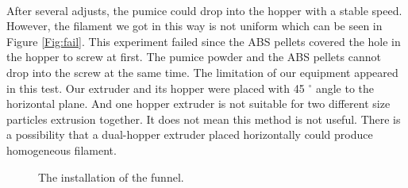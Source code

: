 \\
After several adjusts, the pumice could drop into the hopper with a stable speed. However, the filament we got in this way is not uniform which can be seen in Figure \ref{Fig:fail}. This experiment failed since the ABS pellets covered the hole in the hopper to screw at first. The pumice powder and the ABS pellets cannot drop into the screw at the same time. The limitation of our equipment appeared in this test. Our extruder and its hopper were placed with 45 $^{\circ}$ angle to the horizontal plane. And one hopper extruder is not suitable for two different size particles extrusion together. It does not mean this method is not useful. There is a possibility that a dual-hopper extruder placed horizontally could produce homogeneous filament.

\begin{figure}[htbp] %
	\centering
  \caption[The installation of the funnel]{\footnotesize The installation of the funnel.}
  \label{Fig:funnel install}
\end{figure}

